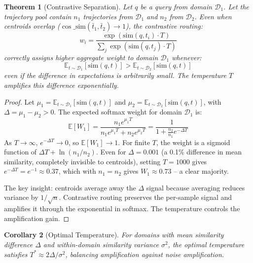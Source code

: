 \documentclass[11pt]{article}
\newtheorem{theorem}{Theorem}[section]
\newtheorem{corollary}[theorem]{Corollary}
\begin{document}
\begin{theorem}[Contrastive Separation]\label{thm:contrastive}
Let $q$ be a query from domain $\mathcal{D}_1$. Let the trajectory pool contain $n_1$ trajectories from $\mathcal{D}_1$ and $n_2$ from $\mathcal{D}_2$. Even when centroids overlap ($\cos\_\text{sim}(\bar{t}_1, \bar{t}_2) \to 1$), the contrastive routing:
\begin{equation}
w_i = \frac{\exp(\text{sim}(q, t_i) \cdot T)}{\sum_j \exp(\text{sim}(q, t_j) \cdot T)}
\end{equation}
correctly assigns higher aggregate weight to domain $\mathcal{D}_1$ whenever:
\begin{equation}
\mathbb{E}_{t \sim \mathcal{D}_1}[\text{sim}(q, t)] > \mathbb{E}_{t \sim \mathcal{D}_2}[\text{sim}(q, t)]
\end{equation}
even if the difference in expectations is arbitrarily small. The temperature $T$ amplifies this difference exponentially.
\end{theorem}
\begin{proof}
Let $\mu_1 = \mathbb{E}_{t \sim \mathcal{D}_1}[\text{sim}(q, t)]$ and $\mu_2 = \mathbb{E}_{t \sim \mathcal{D}_2}[\text{sim}(q, t)]$, with $\Delta = \mu_1 - \mu_2 > 0$. The expected softmax weight for domain $\mathcal{D}_1$ is:
\begin{equation}
\mathbb{E}[W_1] = \frac{n_1 e^{\mu_1 T}}{n_1 e^{\mu_1 T} + n_2 e^{\mu_2 T}} = \frac{1}{1 + \frac{n_2}{n_1} e^{-\Delta T}}
\end{equation}
As $T \to \infty$, $e^{-\Delta T} \to 0$, so $\mathbb{E}[W_1] \to 1$. For finite $T$, the weight is a sigmoid function of $\Delta T + \ln(n_1/n_2)$. Even for $\Delta = 0.001$ (a 0.1\% difference in mean similarity, completely invisible to centroids), setting $T = 1000$ gives $e^{-\Delta T} = e^{-1} \approx 0.37$, which with $n_1 = n_2$ gives $W_1 \approx 0.73$ -- a clear majority.

The key insight: centroids average away the $\Delta$ signal because averaging reduces variance by $1/\sqrt{n}$. Contrastive routing preserves the per-sample signal and amplifies it through the exponential in softmax. The temperature controls the amplification gain.
\end{proof}

\begin{corollary}[Optimal Temperature]
For domains with mean similarity difference $\Delta$ and within-domain similarity variance $\sigma^2$, the optimal temperature satisfies $T^* \approx 2\Delta / \sigma^2$, balancing amplification against noise amplification.
\end{corollary}
\end{document}
